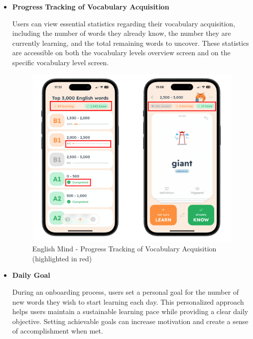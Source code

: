 \begin{itemize}
    \item \textbf{Progress Tracking of Vocabulary Acquisition} 
    \label{chap:em-progess-tracking-of-vocabulary-aquisition}
    
    Users can view essential statistics regarding their vocabulary acquisition, including the number of words they already know, the number they are currently learning, and the total remaining words to uncover. These statistics are accessible on both the vocabulary levels overview screen and on the specific vocabulary level screen.

    \begin{figure}[!h]
        \includegraphics[width=1.1\textwidth]{src/figures/em-progress-tracking.png}
        \caption{English Mind - Progress Tracking of Vocabulary Acquisition (highlighted in red)}
        \label{fig:em-progress-tracking}
    \end{figure}

    \newpage

    \item \textbf{Daily Goal}
    \label{chap:em-daily-goal}
    
    During an onboarding process, users set a personal goal for the number of new words they wish to start learning each day. This personalized approach helps users maintain a sustainable learning pace while providing a clear daily objective. Setting achievable goals can increase motivation and create a sense of accomplishment when met.


\end{itemize}
